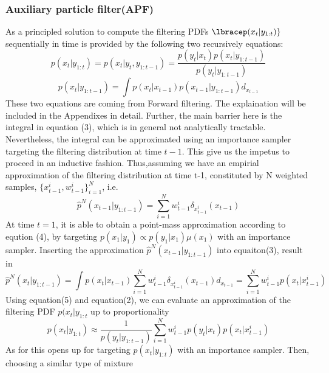 \documentclass[11pt,oneside,a4paper]{article}
\begin{document}
\subsubsection{Auxiliary particle filter(APF)}
As a principled solution to compute the filtering PDFs $ \lbracep(x_t|y_{1:t})\rbrace $ sequentially in time is provided by the following
two recursively equations:\\
\begin{equation}
p(x_{t} | y_{1:t}) = p(x_t | y_t, y_{1:t-1}) = \frac{p(y_t|x_t)p(x_t|y_{1:t-1})}{p(y_t|y_{1:t-1})}
\end{equation}
\begin{equation}
p(x_{t} | y_{1:t-1}) = \int p(x_t|x_{t-1})p(x_{t-1}|y_{1:t-1}) d_{x_{t-1}}
\end{equation}
These two equations are coming from Forward filtering. The explaination will be included in the Appendixes in detail. Further, the main barrier here is the integral in equation (3), which is in general
not analytically tractable. Nevertheless, the integral can be approximated using an importance sampler targeting the filtering distribution at time $ t-1 $. This give us the impetus to proceed in an inductive
fashion. Thus,assuming we have an empirial approximation of the filtering distribution at time t-1, constituted by N weighted samples, $\{ x_{t-1}^i, w_{t-1}^i \}_{i=1}^{N} $, i.e.
\begin{equation}
\hat{p}^N(x_{t-1}|y_{1:t-1}) = \sum_{i=1}^N w_{t-1}^i\delta_{x_{t-1}^i}(x_{t-1})
\end{equation}
At time $t = 1 $, it is able to obtain a point-mass approximation according to eqution (4), by targeting $p(x_{1}|y_{1}) \propto p(y_{1}|x_{1})\mu{(x_{1})} $ with an importance sampler. Inserting the approximation
$\hat{p}^N(x_{t-1}|y_{1:t-1}) $ into equaiton(3), result in
\begin{equation}
\hat{p}^N(x_{t}|y_{1:t-1}) = \int p(x_{t}|x_{t-1}) \sum_{i=1}^{N} w_{t-1}^{i}\delta_{x_{t-1}^{i}}(x_{t-1})d_{x_{t-1}} = \sum_{i=1}^{N}w_{t-1}^{i}p(x_{t}|x_{t-1}^{i})
\end{equation}
Using equation(5) and equation(2), we can evaluate an approximation of the filtering PDF $p(x_t|y_{1:t} $ up to proportionality
\begin{equation}
p(x_{t}|y_{1:t}) \approx \frac{1}{p(y_t|y_{1:t-1})} \sum_{i=1}^N w_{t-1}^i p(y_t|x_t)p(x_t|x_{t-1}^i)
\end{equation}
As for this opens up for targeting $p(x_{t}|y_{1:t}) $ with an importance sampler. Then, choosing a similar type of mixture
\end{document}
